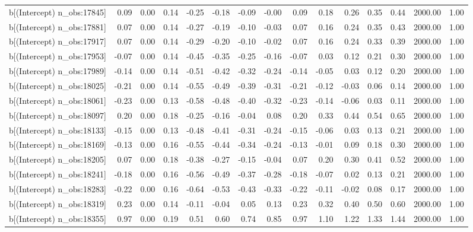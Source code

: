 \begin{table}[ht]
\begin{tabular}{rrrrrrrrrrrrrrr}
  b[(Intercept) n\_obs:17845] & 0.09 & 0.00 & 0.14 & -0.25 & -0.18 & -0.09 & -0.00 & 0.09 & 0.18 & 0.26 & 0.35 & 0.44 & 2000.00 & 1.00 \\ 
  b[(Intercept) n\_obs:17881] & 0.07 & 0.00 & 0.14 & -0.27 & -0.19 & -0.10 & -0.03 & 0.07 & 0.16 & 0.24 & 0.35 & 0.43 & 2000.00 & 1.00 \\ 
  b[(Intercept) n\_obs:17917] & 0.07 & 0.00 & 0.14 & -0.29 & -0.20 & -0.10 & -0.02 & 0.07 & 0.16 & 0.24 & 0.33 & 0.39 & 2000.00 & 1.00 \\ 
  b[(Intercept) n\_obs:17953] & -0.07 & 0.00 & 0.14 & -0.45 & -0.35 & -0.25 & -0.16 & -0.07 & 0.03 & 0.12 & 0.21 & 0.30 & 2000.00 & 1.00 \\ 
  b[(Intercept) n\_obs:17989] & -0.14 & 0.00 & 0.14 & -0.51 & -0.42 & -0.32 & -0.24 & -0.14 & -0.05 & 0.03 & 0.12 & 0.20 & 2000.00 & 1.00 \\ 
  b[(Intercept) n\_obs:18025] & -0.21 & 0.00 & 0.14 & -0.55 & -0.49 & -0.39 & -0.31 & -0.21 & -0.12 & -0.03 & 0.06 & 0.14 & 2000.00 & 1.00 \\ 
  b[(Intercept) n\_obs:18061] & -0.23 & 0.00 & 0.13 & -0.58 & -0.48 & -0.40 & -0.32 & -0.23 & -0.14 & -0.06 & 0.03 & 0.11 & 2000.00 & 1.00 \\ 
  b[(Intercept) n\_obs:18097] & 0.20 & 0.00 & 0.18 & -0.25 & -0.16 & -0.04 & 0.08 & 0.20 & 0.33 & 0.44 & 0.54 & 0.65 & 2000.00 & 1.00 \\ 
  b[(Intercept) n\_obs:18133] & -0.15 & 0.00 & 0.13 & -0.48 & -0.41 & -0.31 & -0.24 & -0.15 & -0.06 & 0.03 & 0.13 & 0.21 & 2000.00 & 1.00 \\ 
  b[(Intercept) n\_obs:18169] & -0.13 & 0.00 & 0.16 & -0.55 & -0.44 & -0.34 & -0.24 & -0.13 & -0.01 & 0.09 & 0.18 & 0.30 & 2000.00 & 1.00 \\ 
  b[(Intercept) n\_obs:18205] & 0.07 & 0.00 & 0.18 & -0.38 & -0.27 & -0.15 & -0.04 & 0.07 & 0.20 & 0.30 & 0.41 & 0.52 & 2000.00 & 1.00 \\ 
  b[(Intercept) n\_obs:18241] & -0.18 & 0.00 & 0.16 & -0.56 & -0.49 & -0.37 & -0.28 & -0.18 & -0.07 & 0.02 & 0.13 & 0.21 & 2000.00 & 1.00 \\ 
  b[(Intercept) n\_obs:18283] & -0.22 & 0.00 & 0.16 & -0.64 & -0.53 & -0.43 & -0.33 & -0.22 & -0.11 & -0.02 & 0.08 & 0.17 & 2000.00 & 1.00 \\ 
  b[(Intercept) n\_obs:18319] & 0.23 & 0.00 & 0.14 & -0.11 & -0.04 & 0.05 & 0.13 & 0.23 & 0.32 & 0.40 & 0.50 & 0.60 & 2000.00 & 1.00 \\ 
  b[(Intercept) n\_obs:18355] & 0.97 & 0.00 & 0.19 & 0.51 & 0.60 & 0.74 & 0.85 & 0.97 & 1.10 & 1.22 & 1.33 & 1.44 & 2000.00 & 1.00 \\ 

\end{tabular}
\end{table}
